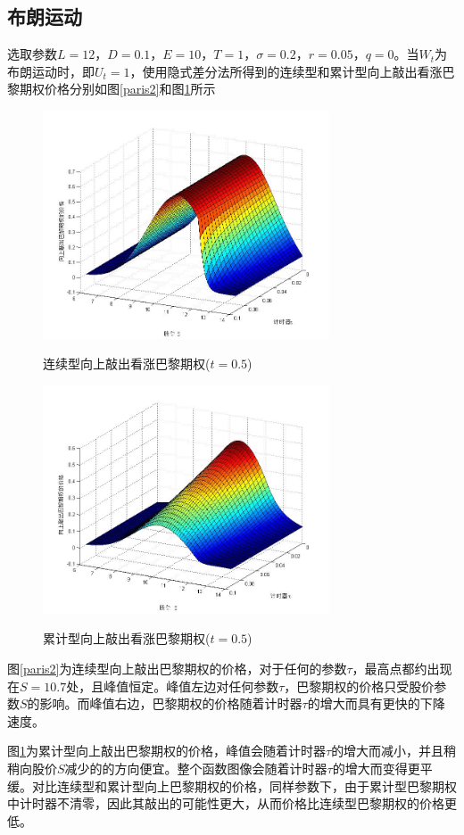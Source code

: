 \documentclass{ctexart} %
\begin{document}
\subsection{布朗运动}
选取参数$L=12$，$D=0.1$，$E=10$，$T=1$，$\sigma=0.2$，$r=0.05$，$q=0$。当$W_t$为布朗运动时，即$U_t=1$，使用隐式差分法所得到的连续型和累计型向上敲出看涨巴黎期权价格分别如图\ref{paris2}和图\ref{parisc2}所示
\begin{figure}[H]
\begin{minipage}{0.48\linewidth}
\label{paris2}
\includegraphics[width=8.5cm]{code/paris2.jpg}
\caption{连续型向上敲出看涨巴黎期权($t=0.5$)}
\end{minipage}
\begin{minipage}{0.48\linewidth}
\label{parisc2}
\includegraphics[width=8.5cm]{code/parisc2.jpg}
\caption{累计型向上敲出看涨巴黎期权($t=0.5$)}
\end{minipage}
\end{figure}
图\ref{paris2}为连续型向上敲出巴黎期权的价格，对于任何的参数$\tau$，最高点都约出现在$S=10.7$处，且峰值恒定。峰值左边对任何参数$\tau$，巴黎期权的价格只受股价参数$S$的影响。而峰值右边，巴黎期权的价格随着计时器$\tau$的增大而具有更快的下降速度。

图\ref{parisc2}为累计型向上敲出巴黎期权的价格，峰值会随着计时器$\tau$的增大而减小，并且稍稍向股价$S$减少的的方向便宜。整个函数图像会随着计时器$\tau$的增大而变得更平缓。对比连续型和累计型向上巴黎期权的价格，同样参数下，由于累计型巴黎期权中计时器不清零，因此其敲出的可能性更大，从而价格比连续型巴黎期权的价格更低。
\iffalse
\end{document}
